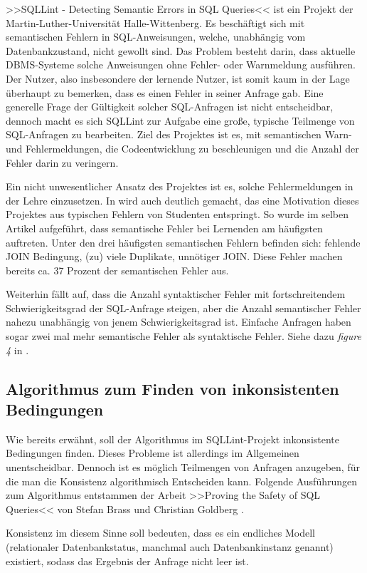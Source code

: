 >>SQLLint - Detecting Semantic Errors in SQL Queries<< ist ein Projekt der Martin-Luther-Universität Halle-Wittenberg. Es beschäftigt sich mit semantischen Fehlern in SQL-Anweisungen, welche, unabhängig vom Datenbankzustand, nicht gewollt sind. Das Problem besteht darin, dass aktuelle DBMS-Systeme solche Anweisungen ohne Fehler- oder Warnmeldung ausführen. Der Nutzer, also insbesondere der lernende Nutzer, ist somit kaum in der Lage überhaupt zu bemerken, dass es einen Fehler in seiner Anfrage gab. Eine generelle Frage der Gültigkeit solcher SQL-Anfragen ist nicht entscheidbar, dennoch macht es sich SQLLint zur Aufgabe eine große, typische Teilmenge von SQL-Anfragen zu bearbeiten. Ziel des Projektes ist es, mit semantischen Warn- und Fehlermeldungen, die Codeentwicklung zu beschleunigen und die Anzahl der Fehler darin zu veringern.

Ein nicht unwesentlicher Ansatz des Projektes ist es, solche Fehlermeldungen in der Lehre einzusetzen. In \cite{sqllint1} wird auch deutlich gemacht, das eine Motivation dieses Projektes aus typischen Fehlern von Studenten entspringt. So wurde im selben Artikel aufgeführt, dass semantische Fehler bei Lernenden am häufigsten auftreten. Unter den drei häufigsten semantischen Fehlern befinden sich: fehlende JOIN Bedingung, (zu) viele Duplikate, unnötiger JOIN. Diese Fehler machen bereits ca. 37 Prozent der semantischen Fehler aus.

Weiterhin fällt auf, dass die Anzahl syntaktischer Fehler mit fortschreitendem Schwierigkeitsgrad der SQL-Anfrage steigen, aber die Anzahl semantischer Fehler nahezu unabhängig von jenem Schwierigkeitsgrad ist. Einfache Anfragen haben sogar zwei mal mehr semantische Fehler als syntaktische Fehler. Siehe dazu \emph{figure 4} in \cite{sqllint1}.

\subsection{Algorithmus zum Finden von inkonsistenten Bedingungen}

Wie bereits erwähnt, soll der Algorithmus im SQLLint-Projekt inkonsistente Bedingungen finden. Dieses Probleme ist allerdings im Allgemeinen unentscheidbar. Dennoch ist es möglich Teilmengen von Anfragen anzugeben, für die man die Konsistenz algorithmisch Entscheiden kann. Folgende Ausführungen zum Algorithmus entstammen der Arbeit >>Proving the Safety of SQL Queries<< von Stefan Brass und Christian Goldberg \cite{brass1}.

Konsistenz im diesem Sinne soll bedeuten, dass es ein endliches Modell (relationaler Datenbankstatus, manchmal auch Datenbankinstanz genannt) existiert, sodass das Ergebnis der Anfrage nicht leer ist.

